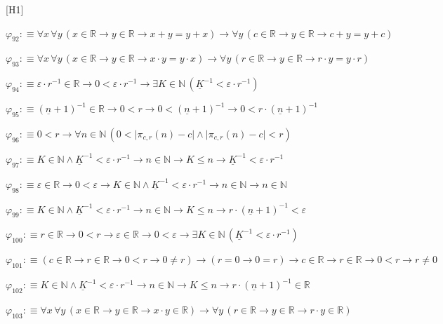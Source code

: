 \begin{fullproof}{[H1]}
\begin{abbrevlist}
\item $\varphi_{92} :\equiv \forall x\,\forall y\,(x \in \mathbb{R} \to y \in \mathbb{R} \to x + y = y + x) \to \forall y\,(c \in \mathbb{R} \to y \in \mathbb{R} \to c + y = y + c)$
\item $\varphi_{93} :\equiv \forall x\,\forall y\,(x \in \mathbb{R} \to y \in \mathbb{R} \to x \cdot y = y \cdot x) \to \forall y\,(r \in \mathbb{R} \to y \in \mathbb{R} \to r \cdot y = y \cdot r)$
\item $\varphi_{94} :\equiv \varepsilon \cdot r^{-1} \in \mathbb{R} \to 0 < \varepsilon \cdot r^{-1} \to \exists K \in \mathbb{N}\,(\underline{K}^{-1} < \varepsilon \cdot r^{-1})$
\item $\varphi_{95} :\equiv (\underline{n} + 1)^{-1} \in \mathbb{R} \to 0 < r \to 0 < (\underline{n} + 1)^{-1} \to 0 < r \cdot (\underline{n} + 1)^{-1}$
\item $\varphi_{96} :\equiv 0 < r \to \forall n \in \mathbb{N}\,(0 < \lvert \pi_{c,r}(n) - c \rvert \land \lvert \pi_{c,r}(n) - c \rvert < r)$
\item $\varphi_{97} :\equiv K \in \mathbb{N} \land \underline{K}^{-1} < \varepsilon \cdot r^{-1} \to n \in \mathbb{N} \to K \leq n \to \underline{K}^{-1} < \varepsilon \cdot r^{-1}$
\item $\varphi_{98} :\equiv \varepsilon \in \mathbb{R} \to 0 < \varepsilon \to K \in \mathbb{N} \land \underline{K}^{-1} < \varepsilon \cdot r^{-1} \to n \in \mathbb{N} \to n \in \mathbb{N}$
\item $\varphi_{99} :\equiv K \in \mathbb{N} \land \underline{K}^{-1} < \varepsilon \cdot r^{-1} \to n \in \mathbb{N} \to K \leq n \to r \cdot (\underline{n} + 1)^{-1} < \varepsilon$
\item $\varphi_{100} :\equiv r \in \mathbb{R} \to 0 < r \to \varepsilon \in \mathbb{R} \to 0 < \varepsilon \to \exists K \in \mathbb{N}\,(\underline{K}^{-1} < \varepsilon \cdot r^{-1})$
\item $\varphi_{101} :\equiv (c \in \mathbb{R} \to r \in \mathbb{R} \to 0 < r \to 0 \neq r) \to (r = 0 \to 0 = r) \to c \in \mathbb{R} \to r \in \mathbb{R} \to 0 < r \to r \neq 0$
\item $\varphi_{102} :\equiv K \in \mathbb{N} \land \underline{K}^{-1} < \varepsilon \cdot r^{-1} \to n \in \mathbb{N} \to K \leq n \to r \cdot (\underline{n} + 1)^{-1} \in \mathbb{R}$
\item $\varphi_{103} :\equiv \forall x\,\forall y\,(x \in \mathbb{R} \to y \in \mathbb{R} \to x \cdot y \in \mathbb{R}) \to \forall y\,(r \in \mathbb{R} \to y \in \mathbb{R} \to r \cdot y \in \mathbb{R})$

\end{abbrevlist}
\end{fullproof}
